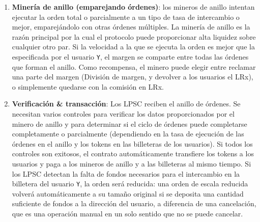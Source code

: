 \documentclass[UTF8,nofonts]{article}
\makeatletter
\newenvironment{figurehere}
 {\def\@captype{figure}}
 {}
\makeatother
\begin{document}
\begin{multicols}{2}
\begin{enumerate}
\begin{center}
\begin{figurehere}

\caption{Proceso de Intercambio de Loopring}
\label{fig:process}
\end{figurehere}
\end{center}

\item \textbf{Miner\'ia de anillo (emparejando \'ordenes)}:  los mineros de anillo intentan ejecutar la orden total o parcialmente a un tipo de tasa de intercambio o mejor, emparej\'andolo con otras \'ordenes m\'ultiples. La miner\'ia de anillo es la raz\'on principal por la cual el protocolo puede proporcionar alta liquidez sobre cualquier otro par. Si la velocidad a la que se ejecuta la orden es mejor que la especificada por el usuario \verb|Y|, el margen se comparte entre todas las \'ordenes que forman el anillo. Como recompensa, el minero puede elegir entre reclamar una parte del margen (Divisi\'on de margen, y devolver a los usuarios el LRx), o simplemente quedarse con la comisi\'on en LRx.


\item \textbf{Verificaci\'on \& transacci\'on}: Los LPSC reciben el anillo de \'ordenes. Se necesitan varios controles para verificar los datos proporcionados por el minero de anillo y para determinar si el ciclo de \'ordenes puede completarse completamente o parcialmente (dependiendo en la tasa de ejecuci\'on de las \'ordenes en el anillo y los tokens en las billeteras de los usuarios). Si todos los controles son exitosos, el contrato autom\'aticamente transfiere los tokens a los usuarios y paga a los mineros de anillo y a las billeteras al mismo tiempo. Si los LPSC detectan la falta de fondos necesarios para el intercambio en la billetera del usuario \verb|Y|, la orden ser\'a reducida: una orden de escala reducida volver\'a autom\'aticamente a su tama\~no original si se deposita una cantidad suficiente de fondos a la direcci\'on del usuario, a diferencia de una cancelaci\'on, que es una operaci\'on manual en un solo sentido que no se puede cancelar.


\end{enumerate}





%
%
%



\end{multicols}
\end{document}
